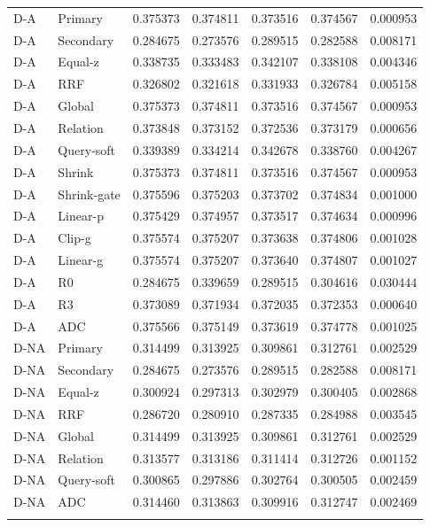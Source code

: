 \begin{table}[htbp]
\begin{tabular}{llrrrrr}
\addlinespace
D-A & Primary & 0.375373 & 0.374811 & 0.373516 & 0.374567 & 0.000953\\
D-A & Secondary & 0.284675 & 0.273576 & 0.289515 & 0.282588 & 0.008171\\
D-A & Equal-z & 0.338735 & 0.333483 & 0.342107 & 0.338108 & 0.004346\\
D-A & RRF & 0.326802 & 0.321618 & 0.331933 & 0.326784 & 0.005158\\
D-A & Global & 0.375373 & 0.374811 & 0.373516 & 0.374567 & 0.000953\\
D-A & Relation & 0.373848 & 0.373152 & 0.372536 & 0.373179 & 0.000656\\
D-A & Query-soft & 0.339389 & 0.334214 & 0.342678 & 0.338760 & 0.004267\\
D-A & Shrink & 0.375373 & 0.374811 & 0.373516 & 0.374567 & 0.000953\\
D-A & Shrink-gate & 0.375596 & 0.375203 & 0.373702 & 0.374834 & 0.001000\\
D-A & Linear-p & 0.375429 & 0.374957 & 0.373517 & 0.374634 & 0.000996\\
D-A & Clip-g & 0.375574 & 0.375207 & 0.373638 & 0.374806 & 0.001028\\
D-A & Linear-g & 0.375574 & 0.375207 & 0.373640 & 0.374807 & 0.001027\\
D-A & R0 & 0.284675 & 0.339659 & 0.289515 & 0.304616 & 0.030444\\
D-A & R3 & 0.373089 & 0.371934 & 0.372035 & 0.372353 & 0.000640\\
D-A & ADC & 0.375566 & 0.375149 & 0.373619 & 0.374778 & 0.001025\\
\addlinespace
D-NA & Primary & 0.314499 & 0.313925 & 0.309861 & 0.312761 & 0.002529\\
D-NA & Secondary & 0.284675 & 0.273576 & 0.289515 & 0.282588 & 0.008171\\
D-NA & Equal-z & 0.300924 & 0.297313 & 0.302979 & 0.300405 & 0.002868\\
D-NA & RRF & 0.286720 & 0.280910 & 0.287335 & 0.284988 & 0.003545\\
D-NA & Global & 0.314499 & 0.313925 & 0.309861 & 0.312761 & 0.002529\\
D-NA & Relation & 0.313577 & 0.313186 & 0.311414 & 0.312726 & 0.001152\\
D-NA & Query-soft & 0.300865 & 0.297886 & 0.302764 & 0.300505 & 0.002459\\
D-NA & ADC & 0.314460 & 0.313863 & 0.309916 & 0.312747 & 0.002469\\
\addlinespace
\bottomrule
\end{tabular}
\end{table}
